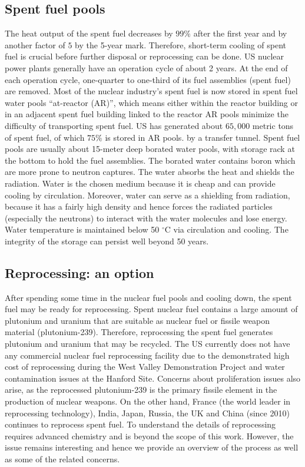 \documentclass[nofootinbib,preprint,aip,pra]{revtex4-1}
\begin{document}
    \subsection{Spent fuel pools}
    The heat output of the spent fuel decreases by $99\%$ after the first year and by another factor of $5$
    by the 5-year mark.\cite{aa12} Therefore, short-term cooling of spent fuel is crucial before
    further disposal or reprocessing can be done.
    US nuclear power plants generally have an operation cycle of about 2 years. At the end of each operation cycle,
    one-quarter to one-third of its fuel assemblies (spent fuel) are removed.
    Most of the nuclear industry's spent fuel is now stored in spent fuel water pools ``at-reactor (AR)'',
    which means either within the reactor building or in an adjacent spent fuel building linked to the reactor
    AR pools minimize the difficulty of transporting spent fuel.\cite{iaea99}
    US has generated about $65,000$ metric tons of spent fuel, of which $75\%$ is stored in AR pools.\cite{a11}
    by a transfer tunnel. 
    Spent fuel pools  are usually about 15-meter deep borated water pools, with storage rack at the bottom to hold the fuel assemblies.
    The borated water contains boron which are more prone to neutron captures.
    The water absorbs the heat and shields the radiation. Water is the chosen medium because it is cheap and
    can provide cooling by circulation. Moreover, water can serve as a shielding from radiation, because it has a
    fairly high density and hence forces the radiated particles (especially the neutrons) to interact with
    the water molecules and lose energy. Water temperature is maintained
    below 50 $^\circ$C via circulation and cooling. The integrity of the storage can persist well beyond 
    50 years.\cite{a11, iaea99}

    \subsection{Reprocessing: an option}
    \label{sec:reproc}
    After spending some time in the nuclear fuel pools and cooling down, the spent fuel may be ready
    for reprocessing.
    Spent nuclear fuel contains a large amount of plutonium and uranium that are suitable as nuclear fuel
    or fissile weapon material (plutonium-239). Therefore, reprocessing the spent fuel generates plutonium and
    uranium that may be recycled. The US currently does not have any commercial nuclear fuel
    reprocessing facility due to the demonstrated high cost of reprocessing
    during the West Valley Demonstration Project and water contamination issues at the Hanford Site.
    Concerns about proliferation issues also arise, as the 
    reprocessed plutonium-239 is the primary fissile element in the production of nuclear weapons.\cite{aa12}
    On the other hand, France (the world leader in reprocessing technology), India, Japan, Russia, the UK
    and China (since 2010) continues to reprocess spent fuel. To understand the details of reprocessing
    requires advanced chemistry and is beyond the scope of this work. However, the issue remains interesting
    and hence we provide an overview of the process as well as some of the related concerns.
\end{document}
